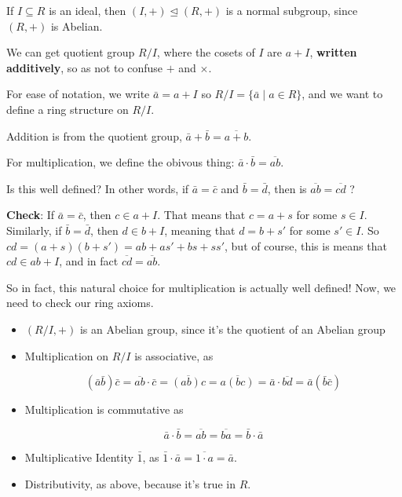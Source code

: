 \documentclass[12pt]{article}
\begin{document}
If $I \subseteq R$ is an ideal, then $(I, +) \trianglelefteq (R, +)$ is a normal
subgroup, since $(R, +)$ is Abelian.

We can get quotient group $R / I$, where the cosets of $I$ are $a + I$, {\bf written
additively}, so as not to confuse $+$ and $\times$.

For ease of notation, we write $\bar a = a + I$ so $R / I = \{\bar a \mid a \in
R\}$, and we want to define a ring structure on $R / I$.

Addition is from the quotient group, $\bar a + \bar b = \overline{a + b}$.

For multiplication, we define the obivous thing: $\bar a \cdot \bar b =
\overline{ab}$. 

Is this well defined? In other words, if $\bar a = \bar c$ and $\bar b = \bar
d$, then is $\overline{ab} = \overline{cd}$ ?

{\bf Check}: If $\bar a = \bar c$, then $c \in a + I$. That means that $c = a +
s$ for some $s \in I$. Similarly, if $\bar b = \bar d$, then $d \in b + I$,
meaning that $d = b + s'$ for some $s' \in I$. So $cd = (a + s)(b + s') = ab +
as' + bs + ss'$, but of course, this is means that $cd \in ab + I$, and in fact
$\overline{cd} = \overline{ab}$.

So in fact, this natural choice for multiplication is actually well defined!
Now, we need to check our ring axioms.

\begin{itemize}
  \item $(R / I, +)$ is an Abelian group, since it's the quotient of an Abelian
    group
  \item Multiplication on $R / I$ is associative, as

    \[
      (\bar a \bar b) \bar c = \overline{ab} \cdot \bar c = \overline{(ab)c} = \overline{a(bc)} = \bar a \cdot \overline{bd} = \bar a (\bar b \bar c)
    \]

  \item Multiplication is commutative as

    \[
      \bar a \cdot \bar b = \overline{ab} = \overline{ba} = \bar b \cdot \bar a
    \]

  \item Multiplicative Identity $\bar 1$, as $\bar 1 \cdot \bar a = \overline{1
    \cdot a} = \bar a$.

  \item Distributivity, as above, because it's true in $R$.
\end{itemize}
\end{document}
